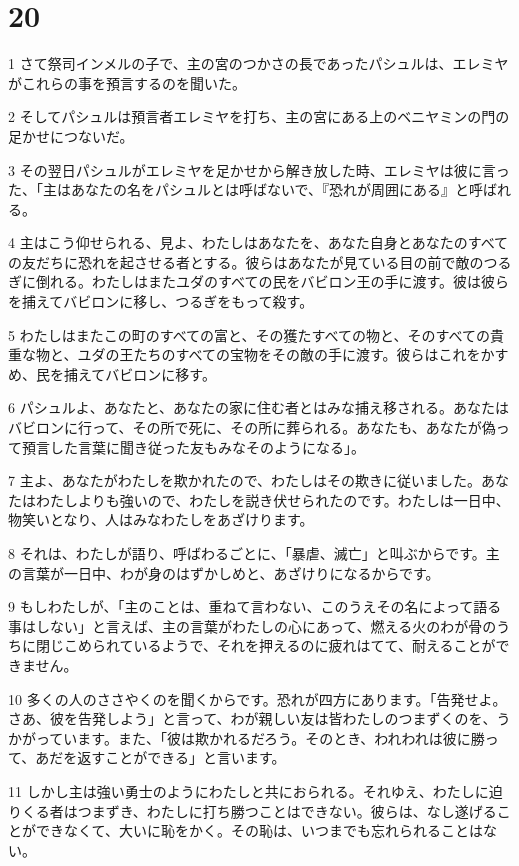 \chapter{20}

\par 1 さて祭司インメルの子で、主の宮のつかさの長であったパシュルは、エレミヤがこれらの事を預言するのを聞いた。
\par 2 そしてパシュルは預言者エレミヤを打ち、主の宮にある上のベニヤミンの門の足かせにつないだ。
\par 3 その翌日パシュルがエレミヤを足かせから解き放した時、エレミヤは彼に言った、「主はあなたの名をパシュルとは呼ばないで、『恐れが周囲にある』と呼ばれる。
\par 4 主はこう仰せられる、見よ、わたしはあなたを、あなた自身とあなたのすべての友だちに恐れを起させる者とする。彼らはあなたが見ている目の前で敵のつるぎに倒れる。わたしはまたユダのすべての民をバビロン王の手に渡す。彼は彼らを捕えてバビロンに移し、つるぎをもって殺す。
\par 5 わたしはまたこの町のすべての富と、その獲たすべての物と、そのすべての貴重な物と、ユダの王たちのすべての宝物をその敵の手に渡す。彼らはこれをかすめ、民を捕えてバビロンに移す。
\par 6 パシュルよ、あなたと、あなたの家に住む者とはみな捕え移される。あなたはバビロンに行って、その所で死に、その所に葬られる。あなたも、あなたが偽って預言した言葉に聞き従った友もみなそのようになる」。
\par 7 主よ、あなたがわたしを欺かれたので、わたしはその欺きに従いました。あなたはわたしよりも強いので、わたしを説き伏せられたのです。わたしは一日中、物笑いとなり、人はみなわたしをあざけります。
\par 8 それは、わたしが語り、呼ばわるごとに、「暴虐、滅亡」と叫ぶからです。主の言葉が一日中、わが身のはずかしめと、あざけりになるからです。
\par 9 もしわたしが、「主のことは、重ねて言わない、このうえその名によって語る事はしない」と言えば、主の言葉がわたしの心にあって、燃える火のわが骨のうちに閉じこめられているようで、それを押えるのに疲れはてて、耐えることができません。
\par 10 多くの人のささやくのを聞くからです。恐れが四方にあります。「告発せよ。さあ、彼を告発しよう」と言って、わが親しい友は皆わたしのつまずくのを、うかがっています。また、「彼は欺かれるだろう。そのとき、われわれは彼に勝って、あだを返すことができる」と言います。
\par 11 しかし主は強い勇士のようにわたしと共におられる。それゆえ、わたしに迫りくる者はつまずき、わたしに打ち勝つことはできない。彼らは、なし遂げることができなくて、大いに恥をかく。その恥は、いつまでも忘れられることはない。
